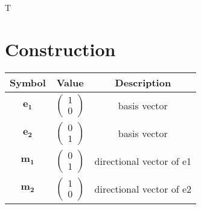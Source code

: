 \documentclass[journal,10pt,twocolumn]{article}
\newcommand{\myvec}[1]{\ensuremath{\begin{pmatrix}#1\end{pmatrix}}}
\let\vec\mathbf
\begin{document}
     
     T
 

\section*{\large Construction}
{
\setlength\extrarowheight{5pt}
\begin{tabular}{|c|c|c|}
	\hline
	\textbf{Symbol}&\textbf{Value}&\textbf{Description}\\
	\hline
	$\vec{e_1}$&$\myvec{1\\0}$&basis vector\\
	\hline
	$\vec{e_2}$&$\myvec{0 \\ 1}$&basis vector\\
	\hline
	$\vec{m_1}$&$\myvec{0\\ 1}$&directional vector of e1\\
	\hline
	$\vec{m_2}$&$\myvec{1\\0}$ &directional vector of e2\\
	\hline
	
	
\end{tabular}
}
\end{document}
